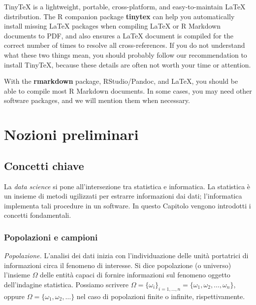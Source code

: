 \documentclass[
  11pt,
]{krantz}
\theoremstyle{definition}
\theoremstyle{definition}
\theoremstyle{definition}
\theoremstyle{definition}
\theoremstyle{remark}
\begin{document}
TinyTeX is a lightweight, portable, cross-platform, and easy-to-maintain LaTeX distribution. The R companion package \textbf{tinytex} \citep{R-tinytex} can help you automatically install missing LaTeX packages when compiling LaTeX or R Markdown documents to PDF, and also ensures a LaTeX document is compiled for the correct number of times to resolve all cross-references. If you do not understand what these two things mean, you should probably follow our recommendation to install TinyTeX, because these details are often not worth your time or attention.

With the \textbf{rmarkdown} package, RStudio/Pandoc, and LaTeX, you should be able to compile most R Markdown documents. In some cases, you may need other software packages, and we will mention them when necessary.

\mainmatter

\hypertarget{part-nozioni-preliminari}{%
\part{Nozioni preliminari}\label{part-nozioni-preliminari}}

\hypertarget{concetti-chiave}{%
\chapter{Concetti chiave}\label{concetti-chiave}}

La \emph{data science} si pone all'intersezione tra statistica e informatica. La statistica è un insieme di metodi ugilizzati per estrarre informazioni dai dati; l'informatica implementa tali procedure in un software. In questo Capitolo vengono introdotti i concetti fondamentali.

\hypertarget{popolazioni-e-campioni}{%
\section{Popolazioni e campioni}\label{popolazioni-e-campioni}}

\emph{Popolazione.} L'analisi dei dati inizia con l'individuazione delle unità portatrici di informazioni circa il fenomeno di interesse. Si dice popolazione (o universo) l'insieme \(\Omega\) delle entità capaci di fornire informazioni sul fenomeno oggetto dell'indagine statistica. Possiamo scrivere \(\Omega = \{\omega_i\}_{i=1, \dots, n}= \{\omega_1, \omega_2, \dots, \omega_n\}\), oppure \(\Omega = \{\omega_1, \omega_2, \dots \}\) nel caso di popolazioni finite o infinite, rispettivamente.
\end{document}
